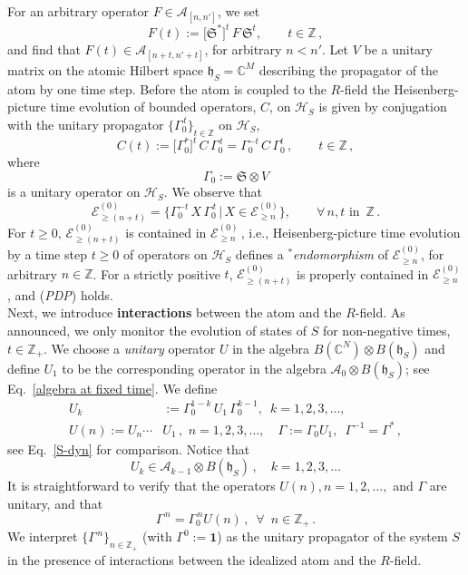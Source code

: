 \documentclass[12pt]{article}
\begin{document}
For an arbitrary operator $F\in \mathcal{A}_{[n,n']}$, we set
$$F(t):=\big[\mathfrak{S}^{*}\big]^{t}\,F\, \mathfrak{S}^{t}, \qquad t \in \mathbb{Z}\,,$$
and find that $F(t) \in \mathcal{A}_{[n+t,n'+t]}$, for arbitrary $n<n'$. Let $V$ be a unitary matrix on the atomic Hilbert space
$\mathfrak{h}_S = \mathbb{C}^{M}$ describing the propagator of the atom by one time step. Before the atom is coupled to the $R$-field the Heisenberg-picture time evolution of bounded operators, $C$, on $\mathcal{H}_S$ is given by conjugation with the unitary propagator
$\big\{\Gamma_{0}^{\,t}\big\}_{t\in \mathbb{Z}}$ on $\mathcal{H}_S$,
\begin{equation*}
C(t):=\big[\Gamma_{0}^{*}\big]^{t}\, C \, \Gamma_{0}^{\,t} = \Gamma_{0}^{-t}\,C\,\Gamma_{0}^{t}\,, \qquad t\in \mathbb{Z}\,,
\end{equation*}
where
\begin{equation}\label{propagator}
\Gamma_{0} := \mathfrak{S} \otimes V
\end{equation}
is a unitary operator on $\mathcal{H}_S$. We observe that
$$
 \mathcal{E}_{\geq (n+t)}^{(0)}=\Big\{\Gamma_{0}^{-t}\, X\, \Gamma_{0}^{\,t} \, \vert \,X \in  \mathcal{E}_{\geq n}^{(0)}\Big\} ,\qquad \forall \, n, t \text{ in }\, \mathbb{Z}\,.
$$
For $t\geq 0,\, \mathcal{E}_{\geq (n+t)}^{(0)}$ is contained in $\mathcal{E}_{\geq n}^{(0)}$\,, i.e., Heisenberg-picture
time evolution by a time step $t\geq 0$ of operators on $\mathcal{H}_S$ defines a $^{*}$\textit{endomorphism} of
 $\mathcal{E}_{\geq n}^{(0)}$, for arbitrary $n \in \mathbb{Z}$. For a strictly positive $t$, $\mathcal{E}_{\geq (n+t)}^{(0)}$ is properly
 contained in $\mathcal{E}_{\geq n}^{(0)}$, and (\textit{PDP}) holds. \\

 Next, we introduce {\bf{interactions}} between the atom and the $R$-field. As announced, we only monitor the
 evolution of states of $S$ for non-negative times, $t\in \mathbb{Z}_{+}$. We choose a \textit{unitary} operator
 $U$ in the algebra $B(\mathbb{C}^{N}) \otimes B(\mathfrak{h}_S)$ and define $U_1$ to be the corresponding
 operator in the algebra \mbox{$\mathcal{A}_{0} \otimes B(\mathfrak{h}_S)$;} see Eq.~\eqref{algebra at fixed time}. We define
 \begin{align}\label{emission op}
 U_k &:= \Gamma_{0}^{1-k} \,U_1\, \Gamma_{0}^{k-1}, \,\,\, k=1,2,3,\dots ,\nonumber \\
 U(n):=  U_{n} \cdots& U_{1} \,, \,\,n=1,2, 3,\dots,\quad \Gamma:= \Gamma_{0} U_1,\,\,\, \Gamma^{-1}= \Gamma^{*}\,,
 \end{align}
 see Eq.~\eqref{S-dyn} for comparison. Notice that
 $$U_k \in \mathcal{A}_{k-1}\otimes B(\mathfrak{h}_S)\,, \quad k=1,2,3,\dots $$
 It is straightforward to verify that the operators $U(n), n=1,2, \dots,$ and $\Gamma$ are unitary, and that
 \begin{equation}\label{semi-group}
 \Gamma^{\,n}=\Gamma_{0}^{\,n} U(n)\,,\,\,\, \forall \,\,\, n \in \mathbb{Z}_{+}\,.
 \end{equation}
 We interpret $\big\{\Gamma^{\,n}\big\}_{n\in \mathbb{Z}_{+}}$ (with $\Gamma^{0}:= \mathbf{1}$) as the unitary propagator of the system $S$ in the presence of interactions between the idealized atom and the $R$-field.\\
\end{document}
